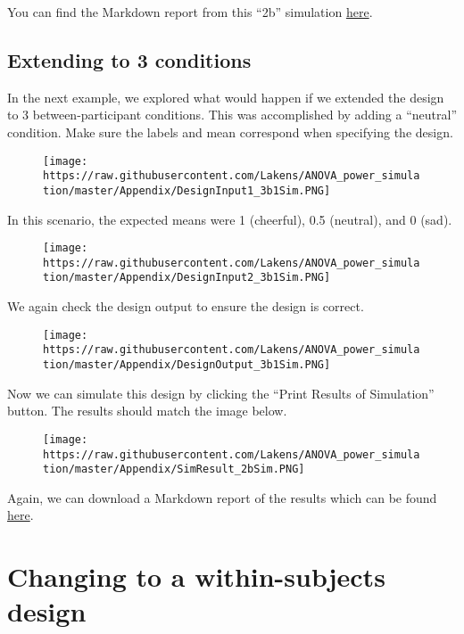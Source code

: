\documentclass[]{article}
\begin{document}
You can find the Markdown report from this ``2b'' simulation
\href{https://github.com/Lakens/ANOVA_power_simulation/blob/master/Appendix/Report_2bSim.pdf}{here}.

\subsection{Extending to 3 conditions}\label{extending-to-3-conditions}

In the next example, we explored what would happen if we extended the
design to 3 between-participant conditions. This was accomplished by
adding a ``neutral'' condition. Make sure the labels and mean correspond
when specifying the design.

\begin{figure}
\centering
\texttt{[image: https://raw.githubusercontent.com/Lakens/ANOVA\_power\_simulation/master/Appendix/DesignInput1\_3b1Sim.PNG]}
\caption{}
\end{figure}

In this scenario, the expected means were 1 (cheerful), 0.5 (neutral),
and 0 (sad).

\begin{figure}
\centering
\texttt{[image: https://raw.githubusercontent.com/Lakens/ANOVA\_power\_simulation/master/Appendix/DesignInput2\_3b1Sim.PNG]}
\caption{}
\end{figure}

We again check the design output to ensure the design is correct.

\begin{figure}
\centering
\texttt{[image: https://raw.githubusercontent.com/Lakens/ANOVA\_power\_simulation/master/Appendix/DesignOutput\_3b1Sim.PNG]}
\caption{}
\end{figure}

Now we can simulate this design by clicking the ``Print Results of
Simulation'' button. The results should match the image below.

\begin{figure}
\centering
\texttt{[image: https://raw.githubusercontent.com/Lakens/ANOVA\_power\_simulation/master/Appendix/SimResult\_2bSim.PNG]}
\caption{}
\end{figure}

Again, we can download a Markdown report of the results which can be
found
\href{https://github.com/Lakens/ANOVA_power_simulation/blob/master/Appendix/Report_3b1Sim.pdf}{here}.

\section{Changing to a within-subjects
design}\label{changing-to-a-within-subjects-design}
\end{document}
